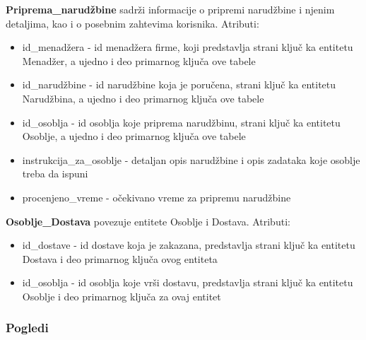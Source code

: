\documentclass[a4paper]{article}
\begin{document}
\vspace{3mm}

\textbf{Priprema\_narudžbine} sadrži informacije o pripremi narudžbine i njenim detaljima, kao i o posebnim zahtevima korisnika. Atributi:
\begin{itemize}
    \item id\_menadžera - id menadžera firme, koji predstavlja strani ključ ka entitetu Menadžer, a ujedno i deo primarnog ključa ove tabele
    \item id\_narudžbine - id narudžbine koja je poručena, strani ključ ka entitetu Narudžbina, a ujedno i deo primarnog ključa ove tabele
    \item id\_osoblja - id osoblja koje priprema narudžbinu, strani ključ ka entitetu Osoblje, a ujedno i deo primarnog ključa ove tabele
    \item instrukcija\_za\_osoblje - detaljan opis narudžbine i opis zadataka koje osoblje treba da ispuni
    \item procenjeno\_vreme - očekivano vreme za pripremu narudžbine
    
\end{itemize}

\vspace{3mm}

\textbf{Osoblje\_Dostava} povezuje entitete Osoblje i Dostava. Atributi:
\begin{itemize}
    \item id\_dostave - id dostave koja je zakazana, predstavlja strani ključ ka entitetu Dostava i deo primarnog ključa ovog entiteta
    \item id\_osoblja - id osoblja koje vrši dostavu, predstavlja strani ključ ka entitetu Osoblje i deo primarnog ključa za ovaj entitet
    
\end{itemize}

\vspace{3mm}


\subsubsection{Pogledi}
\end{document}
